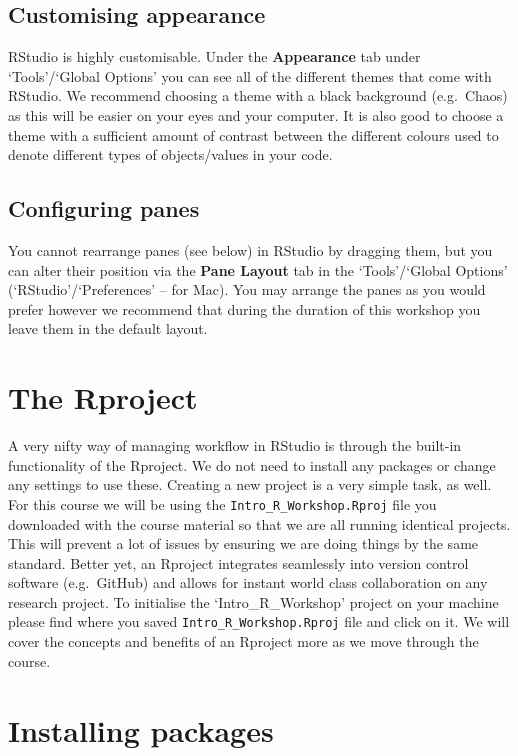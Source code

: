 \documentclass[]{book}
\theoremstyle{definition}
\theoremstyle{definition}
\theoremstyle{definition}
\theoremstyle{remark}
\begin{document}
\subsection{Customising appearance}\label{customising-appearance}

RStudio is highly customisable. Under the \textbf{Appearance} tab under
`Tools'/`Global Options' you can see all of the different themes that
come with RStudio. We recommend choosing a theme with a black background
(e.g.~Chaos) as this will be easier on your eyes and your computer. It
is also good to choose a theme with a sufficient amount of contrast
between the different colours used to denote different types of
objects/values in your code.

\subsection{Configuring panes}\label{configuring-panes}

You cannot rearrange panes (see below) in RStudio by dragging them, but
you can alter their position via the \textbf{Pane Layout} tab in the
`Tools'/`Global Options' (`RStudio'/`Preferences' -- for Mac). You may
arrange the panes as you would prefer however we recommend that during
the duration of this workshop you leave them in the default layout.

\section{The Rproject}\label{the-rproject}

A very nifty way of managing workflow in RStudio is through the built-in
functionality of the Rproject. We do not need to install any packages or
change any settings to use these. Creating a new project is a very
simple task, as well. For this course we will be using the
\texttt{Intro\_R\_Workshop.Rproj} file you downloaded with the course
material so that we are all running identical projects. This will
prevent a lot of issues by ensuring we are doing things by the same
standard. Better yet, an Rproject integrates seamlessly into version
control software (e.g.~GitHub) and allows for instant world class
collaboration on any research project. To initialise the
`Intro\_R\_Workshop' project on your machine please find where you saved
\texttt{Intro\_R\_Workshop.Rproj} file and click on it. We will cover
the concepts and benefits of an Rproject more as we move through the
course.

\section{Installing packages}\label{installing-packages}
\end{document}
